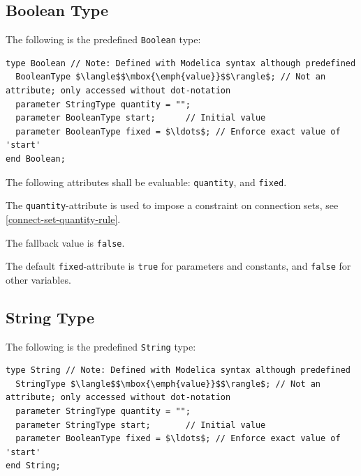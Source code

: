 \subsection{Boolean Type}\label{boolean-type}

The following is the predefined \lstinline!Boolean! type:
\begin{lstlisting}[language=modelica]
type Boolean // Note: Defined with Modelica syntax although predefined
  BooleanType $\langle$$\mbox{\emph{value}}$$\rangle$; // Not an attribute; only accessed without dot-notation
  parameter StringType quantity = "";
  parameter BooleanType start;      // Initial value
  parameter BooleanType fixed = $\ldots$; // Enforce exact value of 'start'
end Boolean;
\end{lstlisting}%
%
%
%

The following attributes shall be evaluable: \lstinline!quantity!, and \lstinline!fixed!.

The \lstinline!quantity!-attribute is used to impose a constraint on connection sets, see \cref{connect-set-quantity-rule}.

The fallback value is \lstinline!false!.

The default \lstinline!fixed!-attribute is \lstinline!true! for parameters and constants, and \lstinline!false! for other variables.

\subsection{String Type}\label{string-type}

The following is the predefined \lstinline!String! type:
\begin{lstlisting}[language=modelica]
type String // Note: Defined with Modelica syntax although predefined
  StringType $\langle$$\mbox{\emph{value}}$$\rangle$; // Not an attribute; only accessed without dot-notation
  parameter StringType quantity = "";
  parameter StringType start;       // Initial value
  parameter BooleanType fixed = $\ldots$; // Enforce exact value of 'start'
end String;
\end{lstlisting}%
%
%


